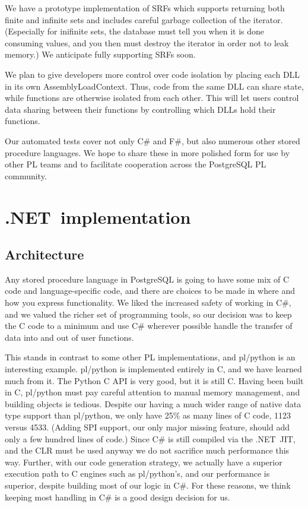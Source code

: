 \documentclass[sigconf,techreport,authorversion,nonacm]{acmart}
\newcommand{\dotnet}{.NET}
\begin{document}
We have a prototype implementation of SRFs which supports returning
both finite and infinite sets and includes careful garbage collection
of the iterator. (Especially for inifinite sets, the database must
tell you when it is done consuming values, and you then must destroy
the iterator in order not to leak memory.) We anticipate fully
supporting SRFs soon.

We plan to give developers more control over code isolation by
placing each DLL in its own AssemblyLoadContext.  Thus, code from
the same DLL can share state, while functions are otherwise isolated
from each other.  This will let users control data sharing between
their functions by controlling which DLLs hold their functions.

Our automated tests cover not only C\# and F\#, but also numerous
other stored procedure languages.  We hope to share these in more
polished form for use by other PL teams and to facilitate cooperation
across the PostgreSQL PL community.

\section{\dotnet\ implementation}

\subsection{Architecture}

Any stored procedure language in PostgreSQL is going to have some
mix of C code and language-specific code, and there are choices to
be made in where and how you express functionality. We liked the
increased safety of working in C\#, and we valued the richer set of
programming tools, so our decision was to keep the C code to a
minimum and use C\# wherever possible handle the transfer of data
into and out of user functions.

This stands in contrast to some other PL implementations, and
pl/python is an interesting example.  pl/python is implemented
entirely in C, and we have learned much from it.  The Python C API
is very good, but it is still C.  Having been built in C, pl/python
must pay careful attention to manual memory management, and building
objects is tedious.  Despite our having a much wider range of native
data type support than pl/python, we only have 25\% as many lines
of C code, 1123 versus 4533.  (Adding SPI support, our only major
missing feature, should add only a few hundred lines of code.) Since
C\# is still compiled via the \dotnet\ JIT, and the CLR must be
used anyway we do not sacrifice much performance this way.  Further,
with our code generation strategy, we actually have a superior
execution path to C engines such as pl/python's, and our performance
is superior, despite building most of our logic in C\#.  For these
reasons, we think keeping most handling in C\# is a good design
decision for us.
\end{document}
